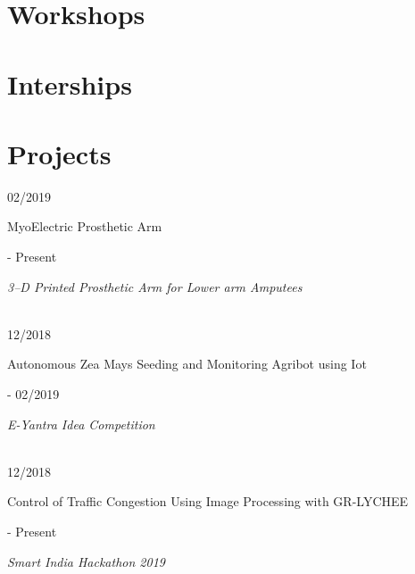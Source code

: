 \documentclass[letterpaper]{twentysecondcv} %
\begin{document}
\section{Workshops}

\begin{twentyshort}
\end{twentyshort}


\section{Interships}

\begin{twenty} %
\end{twenty}


\section{Projects}

\begin{twenty} %

	{\parbox[t]{0.169\textwidth}{02/2019}}
	{MyoElectric Prosthetic Arm}\\
	{\parbox[t]{0.169\textwidth}{- Present}}
	{\small \color{gray}\textit{3--D Printed Prosthetic Arm for Lower arm Amputees}}\\\\
	{\parbox[t]{0.169\textwidth}{12/2018}}
	{Autonomous Zea Mays Seeding and Monitoring Agribot using Iot}\\
	{\parbox[t]{0.169\textwidth}{- 02/2019}}
	{\small \color{gray}\textit{E-Yantra Idea Competition}}\\\\
	{\parbox[t]{0.169\textwidth}{12/2018}}
	{Control of Traffic Congestion Using Image Processing with GR-LYCHEE}\\
	{\parbox[t]{0.169\textwidth}{- Present}}
	{\small \color{gray}\textit{Smart India Hackathon 2019}}
\end{twenty}
\end{document}
